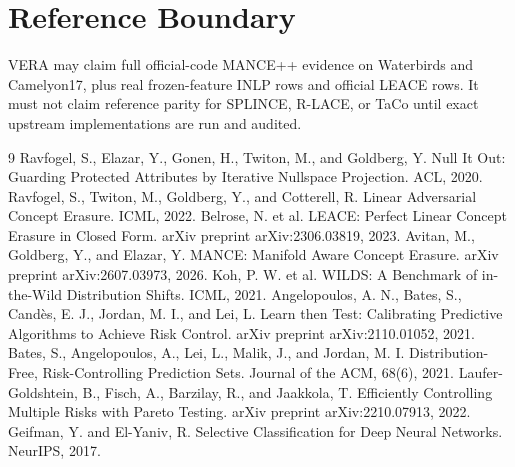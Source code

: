 \documentclass{article}
\begin{document}
\appendix
\section{Reference Boundary}

VERA may claim full official-code MANCE++ evidence on Waterbirds and
Camelyon17, plus real frozen-feature INLP rows and official LEACE rows. It must
not claim reference parity for SPLINCE, R-LACE, or TaCo until exact upstream
implementations are run and audited.

\begin{thebibliography}{9}
Ravfogel, S., Elazar, Y., Gonen, H., Twiton, M., and Goldberg, Y. Null It Out:
Guarding Protected Attributes by Iterative Nullspace Projection. ACL, 2020.
Ravfogel, S., Twiton, M., Goldberg, Y., and Cotterell, R. Linear Adversarial
Concept Erasure. ICML, 2022.
Belrose, N. et al. LEACE: Perfect Linear Concept Erasure in Closed Form. arXiv
preprint arXiv:2306.03819, 2023.
Avitan, M., Goldberg, Y., and Elazar, Y. MANCE: Manifold Aware Concept Erasure.
arXiv preprint arXiv:2607.03973, 2026.
Koh, P. W. et al. WILDS: A Benchmark of in-the-Wild Distribution Shifts. ICML,
2021.
Angelopoulos, A. N., Bates, S., Cand\`es, E. J., Jordan, M. I., and Lei, L.
Learn then Test: Calibrating Predictive Algorithms to Achieve Risk Control.
arXiv preprint arXiv:2110.01052, 2021.
Bates, S., Angelopoulos, A., Lei, L., Malik, J., and Jordan, M. I.
Distribution-Free, Risk-Controlling Prediction Sets. Journal of the ACM,
68(6), 2021.
Laufer-Goldshtein, B., Fisch, A., Barzilay, R., and Jaakkola, T. Efficiently
Controlling Multiple Risks with Pareto Testing. arXiv preprint
arXiv:2210.07913, 2022.
Geifman, Y. and El-Yaniv, R. Selective Classification for Deep Neural
Networks. NeurIPS, 2017.
\end{thebibliography}
\end{document}

